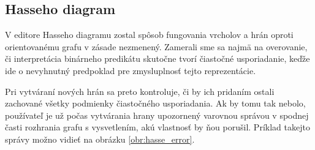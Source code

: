 

\subsection{Hasseho diagram}
\label{sec:hasse_diagram_navrh}


V editore Hasseho diagramu zostal spôsob fungovania vrcholov a hrán oproti orientovanému grafu v zásade nezmenený. Zamerali sme sa najmä na overovanie, či interpretácia binárneho predikátu skutočne tvorí čiastočné usporiadanie, keďže ide o nevyhnutný predpoklad pre zmysluplnosť tejto reprezentácie.

Pri vytváraní nových hrán sa preto kontroluje, či by ich pridaním ostali zachované všetky podmienky čiastočného usporiadania. Ak by tomu tak nebolo, používateľ je už počas vytvárania hrany upozornený varovnou správou v spodnej časti rozhrania grafu s vysvetlením, akú vlastnosť by ňou porušil. Príklad takejto správy možno vidieť na obrázku \ref{obr:hasse_error}.

